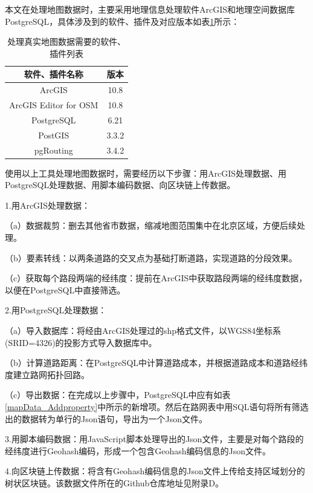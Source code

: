 本文在处理地图数据时，主要采用地理信息处理软件ArcGIS和地理空间数据库PostgreSQL，具体涉及到的软件、插件及对应版本如表\ref{mapDataApp}所示：
\begin{table}[ht]
    \linespread{1.5}
    \centering
    \caption{处理真实地图数据需要的软件、插件列表}
    \label{mapDataApp}
    \begin{tabular}{cc}
    \toprule
    软件、插件名称 & 版本 \\
    \midrule
    ArcGIS & 10.8\\
    ArcGIS Editor for OSM & 10.8\\
    PostgreSQL & 6.21\\
    PostGIS & 3.3.2\\
    pgRouting & 3.4.2\\
    \bottomrule
    \end{tabular}
\end{table}

使用以上工具处理地图数据时，需要经历以下步骤：用ArcGIS处理数据、用PostgreSQL处理数据、用脚本编码数据、向区块链上传数据。

1.用ArcGIS处理数据：

（a）数据裁剪：删去其他省市数据，缩减地图范围集中在北京区域，方便后续处理。

（b）要素转线：以两条道路的交叉点为基础打断道路，实现道路的分段效果。

（c）获取每个路段两端的经纬度：提前在ArcGIS中获取路段两端的经纬度数据，以便在PostgreSQL中直接筛选。

2.用PostgreSQL处理数据：

（a）导入数据库：将经由ArcGIS处理过的shp格式文件，以WGS84坐标系(SRID=4326)的投影方式导入数据库中。

（b）计算道路距离：在PostgreSQL中计算道路成本，并根据道路成本和道路经纬度建立路网拓扑回路。

（c）导出数据：在完成以上步骤中，PostgreSQL中应有如表\ref{mapData_Addproperty}中所示的新增项。然后在路网表中用SQL语句将所有筛选出的数据转为单行的Json语句，导出为一个Json文件。

3.用脚本编码数据：用JavaScript脚本处理导出的Json文件，主要是对每个路段的经纬度进行Geohash编码，形成一个包含Geohash编码信息的Json文件。

4.向区块链上传数据：将含有Geohash编码信息的Json文件上传给支持区域划分的树状区块链。该数据文件所在的Github仓库地址见附录D。


